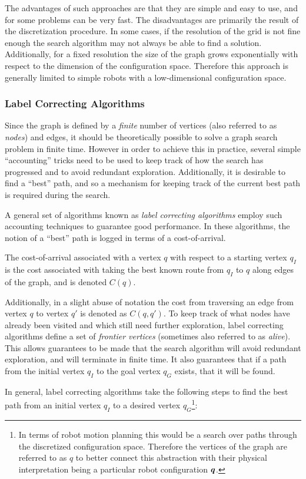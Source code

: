 The advantages of such approaches are that they are simple and easy to use, and for some problems can be very fast. The disadvantages are primarily the result of the discretization procedure. In some cases, if the resolution of the grid is not fine enough the search algorithm may not always be able to find a solution. Additionally, for a fixed resolution the size of the graph grows exponentially with respect to the dimension of the configuration space. Therefore this approach is generally limited to simple robots with a low-dimensional configuration space.

\subsubsection{Label Correcting Algorithms}
Since the graph is defined by a \textit{finite} number of vertices (also referred to as \textit{nodes}) and edges, it should be theoretically possible to solve a graph search problem in finite time. However in order to achieve this in practice, several simple ``accounting'' tricks need to be used to keep track of how the search has progressed and to avoid redundant exploration. Additionally, it is desirable to find a ``best'' path, and so a mechanism for keeping track of the current best path is required during the search.

A general set of algorithms known as \textit{label correcting algorithms} employ such accounting techniques to guarantee good performance. In these algorithms, the notion of a ``best'' path is logged in terms of a cost-of-arrival.
\begin{definition}
The cost-of-arrival associated with a vertex $q$ with respect to a starting vertex $q_I$ is the cost associated with taking the best known route from $q_I$ to $q$ along edges of the graph, and is denoted $C(q)$. 
\end{definition}
Additionally, in a slight abuse of notation the cost from traversing an edge from vertex $q$ to vertex $q'$ is denoted as $C(q,q')$. To keep track of what nodes have already been visited and which still need further exploration, label correcting algorithms define a set of \textit{frontier vertices} (sometimes also referred to as \textit{alive}). This allows guarantees to be made that the search algorithm will avoid redundant exploration, and will terminate in finite time. It also guarantees that if a path from the initial vertex $q_I$ to the goal vertex $q_G$ exists, that it will be found.

In general, label correcting algorithms take the following steps to find the best path from an initial vertex $q_I$ to a desired vertex $q_G$\footnote{In terms of robot motion planning this would be a search over paths through the discretized configuration space. Therefore the vertices of the graph are referred to as $q$ to better connect this abstraction with their physical interpretation being a particular robot configuration $\bm{q}$.}:

